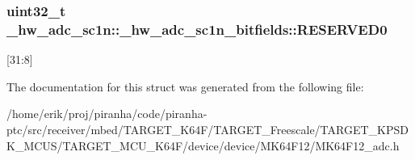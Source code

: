 \subsubsection[{\texorpdfstring{R\+E\+S\+E\+R\+V\+E\+D0}{RESERVED0}}]{\setlength{\rightskip}{0pt plus 5cm}uint32\+\_\+t \+\_\+hw\+\_\+adc\+\_\+sc1n\+::\+\_\+hw\+\_\+adc\+\_\+sc1n\+\_\+bitfields\+::\+R\+E\+S\+E\+R\+V\+E\+D0}\hypertarget{struct__hw__adc__sc1n_1_1__hw__adc__sc1n__bitfields_ade1156a3b9dee2e3b0c85d8d0d09ff6b}{}\label{struct__hw__adc__sc1n_1_1__hw__adc__sc1n__bitfields_ade1156a3b9dee2e3b0c85d8d0d09ff6b}
\mbox{[}31\+:8\mbox{]} 

The documentation for this struct was generated from the following file\+:\begin{DoxyCompactItemize}
\item 
/home/erik/proj/piranha/code/piranha-\/ptc/src/receiver/mbed/\+T\+A\+R\+G\+E\+T\+\_\+\+K64\+F/\+T\+A\+R\+G\+E\+T\+\_\+\+Freescale/\+T\+A\+R\+G\+E\+T\+\_\+\+K\+P\+S\+D\+K\+\_\+\+M\+C\+U\+S/\+T\+A\+R\+G\+E\+T\+\_\+\+M\+C\+U\+\_\+\+K64\+F/device/device/\+M\+K64\+F12/M\+K64\+F12\+\_\+adc.\+h\end{DoxyCompactItemize}
